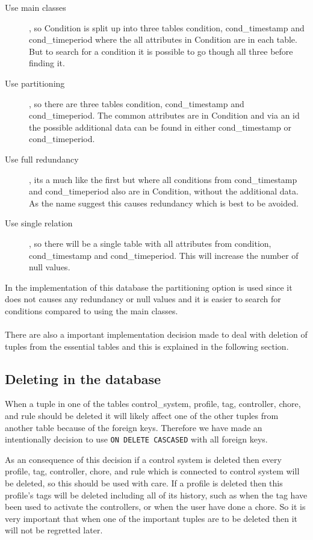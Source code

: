 \begin{description}
	\item[Use main classes], so Condition is split up into three tables condition, cond\_timestamp and cond\_timeperiod where the all attributes in Condition are in each table. But to search for a condition it is possible to go though all three before finding it. 
	\item[Use partitioning], so there are three tables condition, cond\_timestamp and cond\_timeperiod. The common attributes are in Condition and via an id the possible additional data can be found in either cond\_timestamp or cond\_timeperiod.
	\item[Use full redundancy], its a much like the first but where all conditions from cond\_timestamp and cond\_timeperiod also are in Condition, without the additional data. As the name suggest this causes redundancy which is best to be avoided.
	\item[Use single relation], so there will be a single table with all attributes from condition, cond\_timestamp and cond\_timeperiod. This will increase the number of null values. 
\end{description}

In the implementation of this database the partitioning option is used since it does not causes any redundancy or null values and it is easier to search for conditions compared to using the main classes.  \\\\


There are also a important implementation decision made to deal with deletion of tuples from the essential tables and this is explained in the following section.
 
\subsection{Deleting in the database}
When a tuple in one of the tables control\_system, profile, tag, controller, chore, and rule should be deleted it will likely affect one of the other tuples from another table because of the foreign keys. Therefore we have made an intentionally decision to use \texttt{ON DELETE CASCASED} with all foreign keys.

As an consequence of this decision if a control system is deleted then every profile, tag, controller, chore, and rule which is connected to control system will be deleted, so this should be used with care. 
If a profile is deleted then this profile's tags will be deleted including all of its history, such as when the tag have been used to activate the controllers, or when the user have done a chore. So it is very important that when one of the important tuples are to be deleted then it will not be regretted later. \\\\

